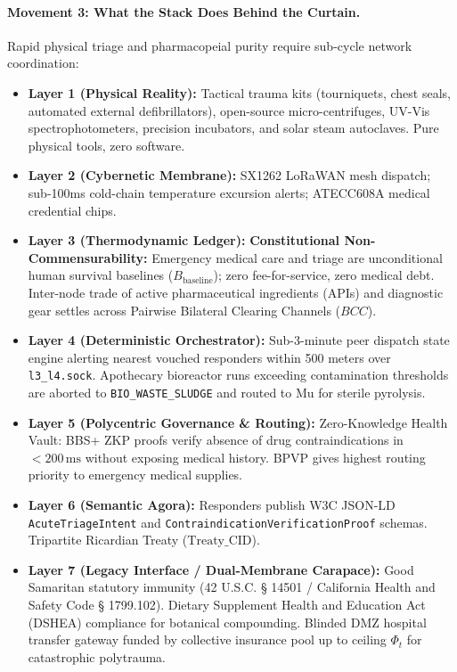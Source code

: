 \paragraph{Movement 3: What the Stack Does Behind the Curtain.}
Rapid physical triage and pharmacopeial purity require sub-cycle network coordination:
\begin{itemize}
    \item \textbf{Layer 1 (Physical Reality):} Tactical trauma kits (tourniquets, chest seals, automated external defibrillators), open-source micro-centrifuges, UV-Vis spectrophotometers, precision incubators, and solar steam autoclaves. Pure physical tools, zero software.
    \item \textbf{Layer 2 (Cybernetic Membrane):} SX1262 LoRaWAN mesh dispatch; sub-100ms cold-chain temperature excursion alerts; ATECC608A medical credential chips.
    \item \textbf{Layer 3 (Thermodynamic Ledger):} \textbf{Constitutional Non-Commensurability:} Emergency medical care and triage are unconditional human survival baselines ($B_{\mathrm{baseline}}$); zero fee-for-service, zero medical debt. Inter-node trade of active pharmaceutical ingredients (APIs) and diagnostic gear settles across Pairwise Bilateral Clearing Channels ($BCC$).
    \item \textbf{Layer 4 (Deterministic Orchestrator):} Sub-3-minute peer dispatch state engine alerting nearest vouched responders within 500 meters over \texttt{l3\_l4.sock}. Apothecary bioreactor runs exceeding contamination thresholds are aborted to \texttt{BIO\_WASTE\_SLUDGE} and routed to Mu for sterile pyrolysis.
    \item \textbf{Layer 5 (Polycentric Governance \& Routing):} Zero-Knowledge Health Vault: BBS+ ZKP proofs verify absence of drug contraindications in $< 200\,\mathrm{ms}$ without exposing medical history. BPVP gives highest routing priority to emergency medical supplies.
    \item \textbf{Layer 6 (Semantic Agora):} Responders publish W3C JSON-LD \texttt{AcuteTriageIntent} and \texttt{ContraindicationVerificationProof} schemas. Tripartite Ricardian Treaty ($\mathrm{Treaty\_CID}$).
    \item \textbf{Layer 7 (Legacy Interface / Dual-Membrane Carapace):} Good Samaritan statutory immunity (42 U.S.C. § 14501 / California Health and Safety Code § 1799.102). Dietary Supplement Health and Education Act (DSHEA) compliance for botanical compounding. Blinded DMZ hospital transfer gateway funded by collective insurance pool up to ceiling $\Phi_t$ for catastrophic polytrauma.
\end{itemize}

